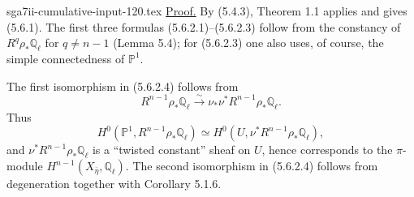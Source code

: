 \begin{filecontents*}{sga7ii-cumulative-input-120.tex}
\underline{Proof.}
By (5.4.3), Theorem 1.1 applies and gives (5.6.1).  The first three
formulas (5.6.2.1)--(5.6.2.3) follow from the constancy of
$R^q\rho_*\mathbb Q_\ell$ for $q\neq n-1$ (Lemma 5.4); for (5.6.2.3) one
also uses, of course, the simple connectedness of $\mathbb P^1$.

The first isomorphism in (5.6.2.4) follows from
\[
R^{n-1}\rho_*\mathbb Q_\ell
\overset{\sim}{\longrightarrow}
\nu_*\nu^*R^{n-1}\rho_*\mathbb Q_\ell.
\]
Thus
\[
H^0(\mathbb P^1,R^{n-1}\rho_*\mathbb Q_\ell)
\simeq
H^0(U,\nu^*R^{n-1}\rho_*\mathbb Q_\ell),
\]
and $\nu^*R^{n-1}\rho_*\mathbb Q_\ell$ is a
\textquotedblleft twisted constant\textquotedblright{} sheaf on $U$, hence
corresponds to the $\pi$-module
$H^{n-1}(X_{\bar\eta},\mathbb Q_\ell)$.  The second isomorphism in
(5.6.2.4) follows from degeneration together with Corollary 5.1.6.


\end{filecontents*}
